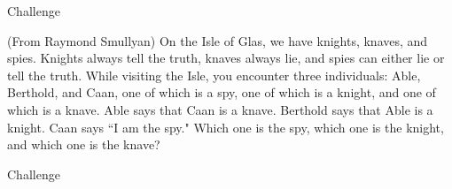 \begin{tagblock}{Challenge}
\begin{question}[CHALLENGE!!!]
	
(From Raymond Smullyan) On the Isle of Glas, we have knights, knaves, and spies. Knights always tell the truth, knaves always lie, and spies can either lie or tell the truth. While visiting the Isle, you encounter three individuals: Able, Berthold, and Caan, one of which is a spy, one of which is a knight, and one of which is a knave.  Able says that Caan is a knave. Berthold says that Able is a knight. Caan says ``I am the spy." Which one is the spy, which one is the knight, and which one is the knave?
	
	
\begin{tags}
	    Challenge
\end{tags}
	
\begin{diary}
\end{diary}
		
\begin{solution}
       
\end{solution}

\end{question}

\end{tagblock}

